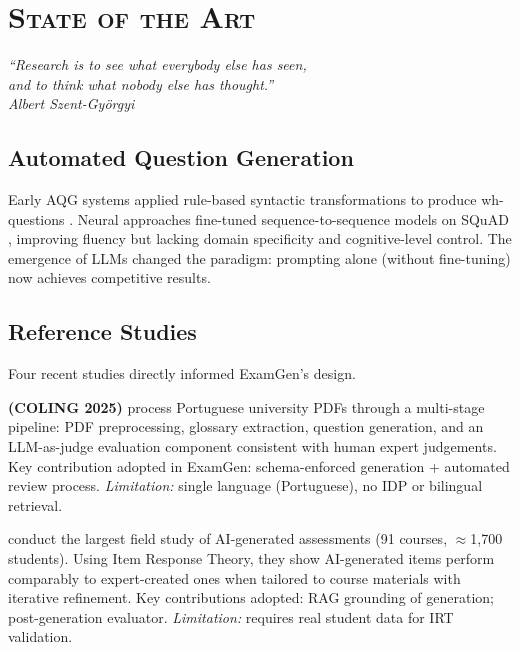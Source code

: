 \newpage
\section{\textsc{State of the Art}}
\label{chap:soa}
\lhead{}
\cfoot{\thepage}
\pagestyle{fancy}
\renewcommand{\headrulewidth}{0.4pt}

\begin{flushright}
\textit{``Research is to see what everybody else has seen,\\
and to think what nobody else has thought.''\\
Albert Szent-Györgyi}
\end{flushright}

\subsection{Automated Question Generation}

Early AQG systems applied rule-based syntactic transformations to produce
wh-questions \cite{heilman2010good}. Neural approaches fine-tuned
sequence-to-sequence models on SQuAD \cite{rajpurkar2016squad}, improving fluency
but lacking domain specificity and cognitive-level control.
The emergence of LLMs changed the paradigm: prompting alone (without fine-tuning)
now achieves competitive results.

\subsection{Reference Studies}

Four recent studies directly informed ExamGen's design.

\textbf{\citet{mucciaccia2025mcq} (COLING 2025)} process Portuguese university PDFs
through a multi-stage pipeline: PDF preprocessing, glossary extraction, question
generation, and an LLM-as-judge evaluation component consistent with human expert
judgements. Key contribution adopted in ExamGen: schema-enforced generation +
automated review process.
\textit{Limitation:} single language (Portuguese), no IDP or bilingual retrieval.

\textbf{\citet{isley2025quality}} conduct the largest field study of AI-generated
assessments (91 courses, $\approx$1,700 students). Using Item Response Theory,
they show AI-generated items perform comparably to expert-created ones when
tailored to course materials with iterative refinement.
Key contributions adopted: RAG grounding of generation; post-generation evaluator.
\textit{Limitation:} requires real student data for IRT validation.

